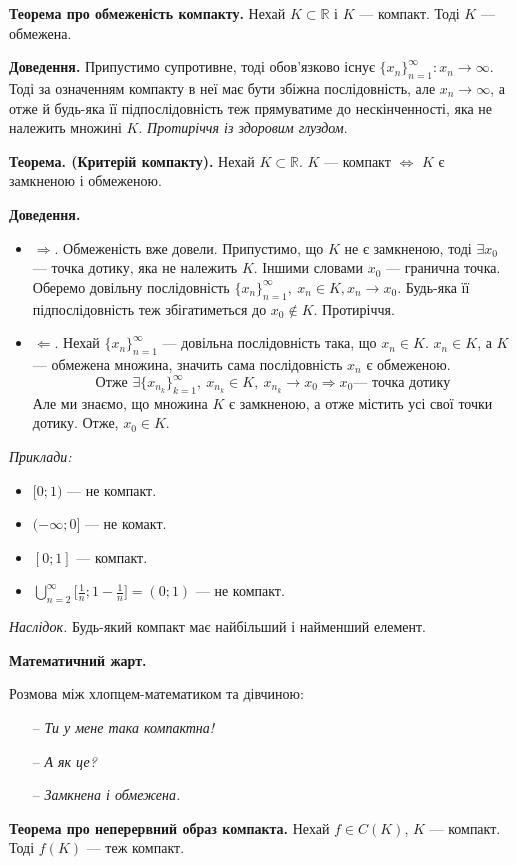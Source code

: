 \documentclass[12pt]{report}
\begin{document}
\textbf{Теорема про обмеженість компакту.} Нехай $K \subset \mathbb{R}$ і $K$ --- компакт. Тоді $K$ --- обмежена.

\textbf{Доведення.} Припустимо супротивне, тоді обов'язково існує $\{ x_n\}_{n=1}^{\infty} : x_n \to \infty$. Тоді за означенням компакту в неї має бути збіжна послідовність, але $x_n \to \infty$, а отже й будь-яка її підпослідовність теж прямуватиме до нескінченності, яка не належить множині $K$. \textit{Протиріччя із здоровим глуздом}.

\vspace{5mm}

\textbf{Теорема. (Критерій компакту).} Нехай $K \subset \mathbb{R}$. $K$ --- компакт $\Longleftrightarrow$ $K$ є замкненою і обмеженою.

\textbf{Доведення.} 
\begin{itemize}
    \item $\Longrightarrow$. Обмеженість вже довели. Припустимо, що $K$ не є замкненою, тоді $\exists x_0$ --- точка дотику, яка не належить $K$. Іншими словами $x_0$ --- гранична точка. Оберемо довільну послідовність $\{ x_n\}_{n=1}^{\infty},\ x_n \in K, x_n \to x_0$. Будь-яка її підпослідовність теж збігатиметься до $x_0 \notin K$. Протиріччя.
    \item $\Longleftarrow$. Нехай $\{ x_n\}_{n=1}^{\infty}$ --- довільна  послідовність така, що $x_n \in K$. $x_n \in K$, а $K$ --- обмежена множина, значить сама послідовність $x_n$ є обмеженою.
    $$\textrm{Отже } \exists \{ x_{n_k}\}_{k=1}^{\infty},\ x_{n_k} \in K,\ x_{n_k} \to x_0 \Longrightarrow x_0 \textrm{--- точка дотику}$$
    Але ми знаємо, що множина $K$ є замкненою, а отже містить усі свої точки дотику. Отже, $x_0 \in K$.
\end{itemize}

\textit{Приклади:}
\begin{itemize}
    \item $[0;1)$ --- не компакт.
    \item $(-\infty;0]$ --- не комакт.
    \item $[0;1]$ --- компакт.
    \item $\bigcup\limits_{n=2}^{\infty} \big[\frac{1}{n}; 1 - \frac{1}{n}\big] = (0;1)$ --- не компакт.
\end{itemize}

\textit{Наслідок.} Будь-який компакт має найбільший і найменший елемент.

\vspace{3mm}

\textbf{Математичний жарт.}

Розмова між хлопцем-математиком та дівчиною:
\begin{itemize}
    \item[--] \textit{Ти у мене така компактна!}
    \item[--] \textit{А як це?}
    \item[--] \textit{Замкнена і обмежена.}
\end{itemize}

\vspace{5mm}

\textbf{Теорема про неперервний образ компакта.} Нехай $f \in C(K)$, $K$ --- компакт. Тоді $f(K)$ --- теж компакт.
\end{document}
